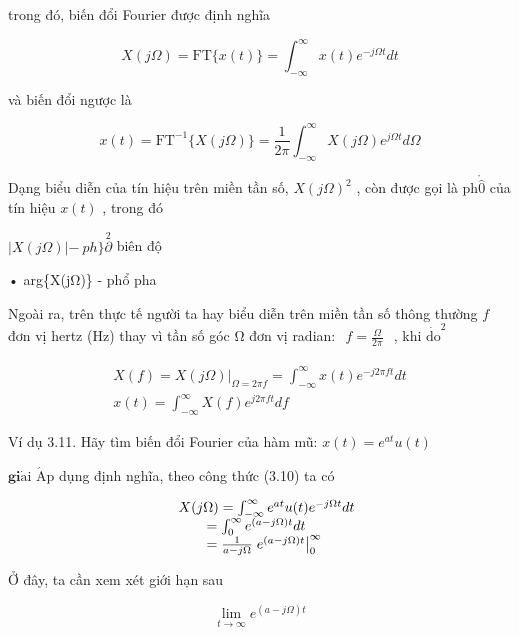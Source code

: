\documentclass[
  10
]{article}
\begin{document}
trong đó, biến đổi Fourier được định nghĩa

\[
X (j \Omega) = \mathrm{FT} \{x (t) \} = \int_ {- \infty} ^ {\infty} x (t) e ^ {- j \Omega t} d t\tag{3.10}
\]

và biến đổi ngược là

\[
x (t) = \mathrm{FT} ^ {- 1} \{X (j \Omega) \} = \frac {1}{2 \pi} \int_ {- \infty} ^ {\infty} X (j \Omega) e ^ {j \Omega t} d \Omega\tag{3.11}
\]

Dạng biểu diễn của tín hiệu trên miền tần số, \(X ( j \Omega ) ^ { 2 }\)
, còn được gọi là \(\mathrm { p h } \mathring { \hat { 0 } }\) của tín
hiệu \(x ( t )\) , trong đó

\(\left| X ( j \Omega ) \right| \mathrm  - \ p h \} \overset { \mathrm { 2 } } { \partial }\)
biên độ

• arg\{X(jΩ)\} - phổ pha

Ngoài ra, trên thực tế người ta hay biểu diễn trên miền tần số thông
thường \(f\) đơn vị hertz (Hz) thay vì tần số góc Ω đơn vị radian:
\(\begin{array} { r } { f = \frac { \Omega } { 2 \pi } } \end{array}\) ,
khi \(\mathrm { { \dot { d o } } ^ { 2 } }\)

\[
\begin{array}{r} X (f) = \left. X (j \Omega) \right| _ {\Omega = 2 \pi f} = \int_ {- \infty} ^ {\infty} x (t) e ^ {- j 2 \pi f t} d t \\ x (t) = \int_ {- \infty} ^ {\infty} X (f) e ^ {j 2 \pi f t} d f \end{array}
\]

Ví dụ 3.11. Hãy tìm biến đổi Fourier của hàm mũ:
\(x ( t ) = e ^ { a t } u ( t )\)

\(\mathbf { g i } \mathrm { \dot { a } i }\)
\(\mathrm { { \acute { A } p } }\) dụng định nghĩa, theo công thức
(3.10) ta có

\[
\begin{array}{r l} & X (j \Omega) = \int_ {- \infty} ^ {\infty} e ^ {a t} u (t) e ^ {- j \Omega t} d t \\ & \qquad = \int_ {0} ^ {\infty} e ^ {(a - j \Omega) t} d t \\ & \qquad = \frac {1}{a - j \Omega} \left. e ^ {(a - j \Omega) t} \right| _ {0} ^ {\infty} \end{array}
\]

Ở đây, ta cần xem xét giới hạn sau

\[
\lim _ {t \to \infty} e ^ {(a - j \Omega) t}
\]
\end{document}
